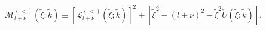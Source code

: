 \begin{equation}
{\mathcal M}^{(<)}_{l+\nu} ( \tilde{\xi};  \tilde{k}  ) 
\!
 \equiv 
\!
\left[
 {\mathcal L}^{(<)}_{l+\nu}  (\tilde{\xi}; \tilde{k}) \right]^{2} 
+ \left[
\tilde{\xi}^{2} - 
\!
(l+\nu)^{2} 
-
\tilde{\xi}^{2} 
\check{U} (\tilde{\xi}; \tilde{k})
\right]
.
\label{eq:mathcal_M_integral_def}
\end{equation}

